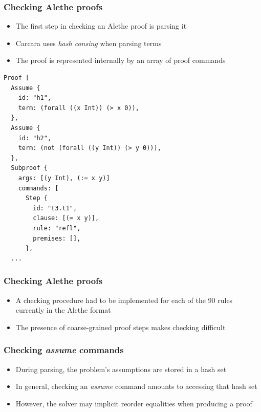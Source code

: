 \documentclass[usepdftitle=false,aspectratio=169]{beamer}
\newcommand\vitem{\vfill\item}
\begin{document}
\begin{frame}[fragile]
  \frametitle{Checking Alethe proofs}
  \begin{minipage}{0.49 \textwidth}
  \begin{itemize}
    \vitem The first step in checking an Alethe proof is parsing it
    \vspace{4ex}
    \vitem Carcara uses \textit{hash consing} when parsing terms
    \vspace{4ex}
    \vitem The proof is represented internally by an array of proof commands
  \end{itemize}
  \end{minipage}
  \begin{minipage}{0.5 \textwidth}
    \vspace{-.35ex}
    \begin{verbatim}
Proof [
  Assume {
    id: "h1",
    term: (forall ((x Int)) (> x 0)),
  },
  Assume {
    id: "h2",
    term: (not (forall ((y Int)) (> y 0))),
  },
  Subproof {
    args: [(y Int), (:= x y)]
    commands: [
      Step {
        id: "t3.t1",
        clause: [(= x y)],
        rule: "refl",
        premises: [],
      },
  ...
    \end{verbatim}
  \end{minipage}
\end{frame}

\begin{frame}
  \frametitle{Checking Alethe proofs}
  \begin{itemize}
    \vitem A checking procedure had to be implemented for each of the 90 rules
    currently in the Alethe format
    \vitem The presence of coarse-grained proof steps makes checking difficult
  \end{itemize}
\end{frame}

\begin{frame}
  \frametitle{Checking \textit{assume} commands}
  \begin{itemize}
    \vitem During parsing, the problem's assumptions are stored in a hash set
    \vitem In general, checking an \textit{assume} command amounts to accessing
    that hash set
    \vitem However, the solver may implicit reorder equalities when producing a
    proof
  \end{itemize}
\end{frame}
\end{document}
